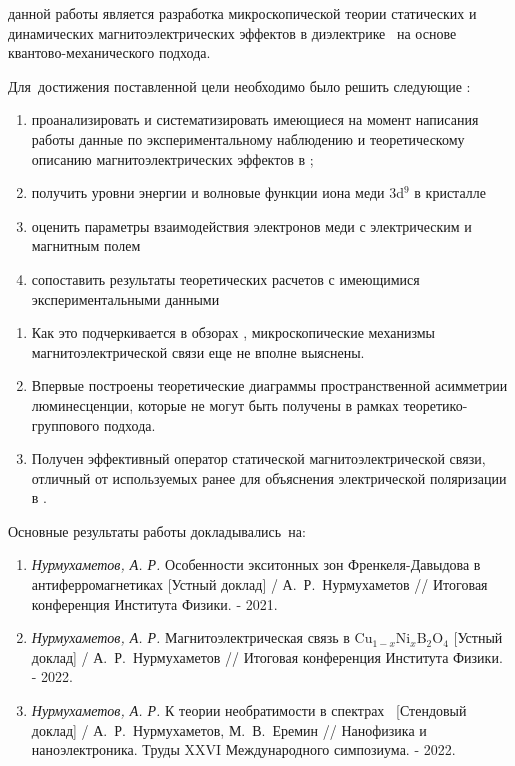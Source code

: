 {\aim} данной работы является разработка микроскопической теории статических и динамических магнитоэлектрических эффектов в диэлектрике \cbo\ на основе квантово-механического подхода.

Для~достижения поставленной цели необходимо было решить следующие {\tasks}:
\begin{enumerate}[beginpenalty=10000] %
	\item проанализировать и систематизировать имеющиеся на момент написания работы данные по экспериментальному наблюдению и теоретическому описанию магнитоэлектрических эффектов в \cbo;
	\item получить уровни энергии и волновые функции иона меди 3d\(^9\) в кристалле \cbo
	\item оценить параметры взаимодействия электронов меди с электрическим и магнитным полем
	\item сопоставить результаты теоретических расчетов с имеющимися экспериментальными данными
\end{enumerate}


{\novelty}
\begin{enumerate}[beginpenalty=10000] %
	\item Как это подчеркивается в обзорах \autocite{Khomskii2009, Moskvin2009, Tokura2014, Shuai2015}, микроскопические механизмы магнитоэлектрической связи еще не вполне выяснены.
	\item Впервые построены теоретические диаграммы пространственной асимметрии люминесценции, которые не могут быть получены в рамках теоретико-группового подхода.
	\item Получен эффективный оператор статической магнитоэлектрической связи, отличный от используемых ранее для объяснения электрической поляризации в \ncbo.
\end{enumerate}


{\probation}
Основные результаты работы докладывались~на:
\begin{enumerate}[beginpenalty=10000] %
	\item \textit{Нурмухаметов, А. Р.} Особенности экситонных зон Френкеля-Давыдова в антиферромагнетиках [Устный доклад] / А.~Р.~Нурмухаметов // Итоговая конференция Института Физики. - 2021.
	\item \textit{Нурмухаметов, А. Р.} Магнитоэлектрическая связь в Cu\(_{1-x}\)Ni\(_{x}\)B\(_{2}\)O\(_{4}\) [Устный доклад] / А.~Р.~Нурмухаметов // Итоговая конференция Института Физики. - 2022.
	\item \textit{Нурмухаметов, А. Р.} К теории необратимости в спектрах \cbo\ [Стендовый доклад] / А.~Р.~Нурмухаметов, М.~В.~Еремин // Нанофизика и наноэлектроника. Труды XXVI Международного симпозиума. - 2022.
\end{enumerate}


